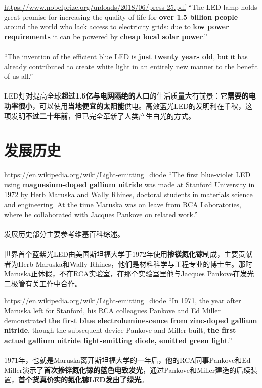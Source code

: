 \begin{slide}{\url{https://www.nobelprize.org/uploads/2018/06/press-25.pdf}}
  ``The LED lamp holds great promise for increasing the quality of life for \textbf{over 1.5 billion people} around the world who lack access to electricity grids: due to \textbf{low power requirements} it can be powered by \textbf{cheap local solar power}.''
  \\~\\
  ``The invention of the efficient blue LED is \textbf{just twenty years old}, but it has already contributed to create white light in an entirely new manner to the benefit of us all.''
  \\~\\
  LED灯对提高全球\textbf{超过\textbf{1.5}亿与电网隔绝的人口}的生活质量大有前景：它\textbf{需要的电功率很小}，可以使用\textbf{当地便宜的太阳能}供电。高效蓝光LED的发明利在千秋，这项发明\textbf{不过二十年前}，但已完全革新了人类产生白光的方式。
\end{slide}

\section{发展历史}

\begin{slide}{\url{https://en.wikipedia.org/wiki/Light-emitting_diode}}
  ``The first blue-violet LED using \textbf{magnesium-doped gallium nitride} was made at Stanford University in 1972 by Herb Maruska and Wally Rhines, doctoral students in materials science and engineering. At the time Maruska was on leave from RCA Laboratories, where he collaborated with Jacques Pankove on related work.''
  \\~\\
  发展历史部分主要参考维基百科综述。
  \\~\\
  世界首个蓝紫光LED由美国斯坦福大学于1972年使用\textbf{掺镁氮化镓}制成，主要贡献者为Herb Maruska和Wally Rhines，他们是材料科学与工程专业的博士生。那时Maruska正休假，不在RCA实验室，在那个实验室里他与Jacques Pankove在发光二极管有关工作中合作。
\end{slide}

\begin{slide}{\url{https://en.wikipedia.org/wiki/Light-emitting_diode}}
  ``In 1971, the year after Maruska left for Stanford, his RCA colleagues Pankove and Ed Miller demonstrated \textbf{the first blue electroluminescence from zinc-doped gallium nitride}, though the subsequent device Pankove and Miller built, \textbf{the first actual gallium nitride light-emitting diode, emitted green light}.''
  \\~\\
  1971年，也就是Maruska离开斯坦福大学的一年后，他的RCA同事Pankove和Ed Miller演示了\textbf{首次掺锌氮化镓的蓝色电致发光}，通过Pankove和Miller建造的后续装置，\textbf{首个货真价实的氮化镓LED发出了绿光}。
\end{slide}

